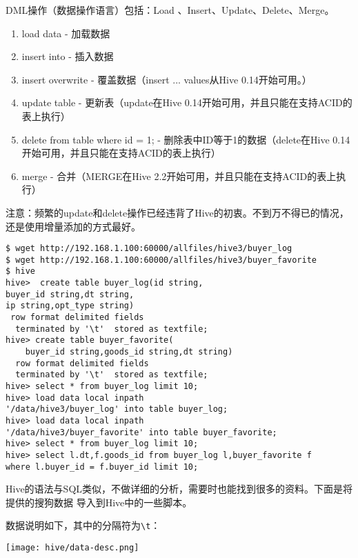 DML操作（数据操作语言）包括：Load 、Insert、Update、Delete、Merge。
\begin{enumerate}
\item load data - 加载数据
\item insert into - 插入数据
\item insert overwrite - 覆盖数据（insert ... values从Hive 0.14开始可用。）
\item update table - 更新表（update在Hive 0.14开始可用，并且只能在支持ACID的表上执行）
\item delete from table where id = 1; - 删除表中ID等于1的数据（delete在Hive 0.14开始可用，并且只能在支持ACID的表上执行）
\item merge - 合并（MERGE在Hive 2.2开始可用，并且只能在支持ACID的表上执行）
\end{enumerate}
注意：频繁的update和delete操作已经违背了Hive的初衷。不到万不得已的情况，还是使用增量添加的方式最好。
\begin{lstlisting}[style=mysh]
$ wget http://192.168.1.100:60000/allfiles/hive3/buyer_log
$ wget http://192.168.1.100:60000/allfiles/hive3/buyer_favorite
$ hive
hive>  create table buyer_log(id string,
buyer_id string,dt string,
ip string,opt_type string)  
 row format delimited fields
  terminated by '\t'  stored as textfile;  
hive> create table buyer_favorite(
	buyer_id string,goods_id string,dt string) 
  row format delimited fields 
  terminated by '\t'  stored as textfile;  
hive> select * from buyer_log limit 10; 
hive> load data local inpath 
'/data/hive3/buyer_log' into table buyer_log;   
hive> load data local inpath 
'/data/hive3/buyer_favorite' into table buyer_favorite; 
hive> select * from buyer_log limit 10;
hive> select l.dt,f.goods_id from buyer_log l,buyer_favorite f 
where l.buyer_id = f.buyer_id limit 10;   
\end{lstlisting}

Hive的语法与SQL类似，不做详细的分析，需要时也能找到很多的资料。下面是将提供的搜狗数据
导入到Hive中的一些脚本。

数据说明如下，其中的分隔符为\lstinline{\t}：



\begin{center}
\texttt{[image: hive/data-desc.png]}
\end{center}



